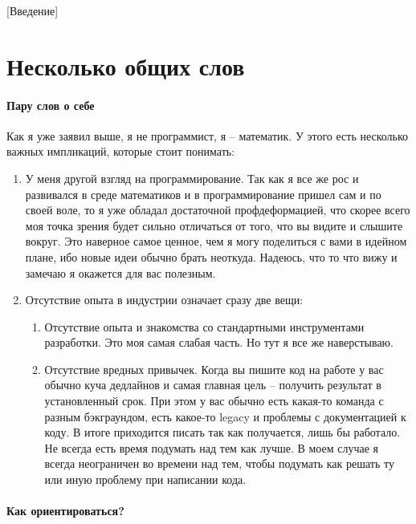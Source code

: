 [Введение]


\section{Несколько общих слов}

\paragraph{Пару слов о себе}

Как я уже заявил выше, я не программист, я -- математик.
У этого есть несколько важных импликаций, которые стоит понимать:
\begin{enumerate}
\item У меня другой взгляд на программирование.
Так как я все же рос и развивался в среде математиков и в программирование пришел сам и по своей воле, то я уже обладал достаточной профдеформацией, что скорее всего моя точка зрения будет сильно отличаться от того, что вы видите и слышите вокруг.
Это наверное самое ценное, чем я могу поделиться с вами в идейном плане, ибо новые идеи обычно брать неоткуда.
Надеюсь, что то что вижу и замечаю я окажется для вас полезным.

\item Отсутствие опыта в индустрии означает сразу две вещи:
\begin{enumerate}
\item Отсутствие опыта и знакомства со стандартными инструментами разработки.
Это моя самая слабая часть.
Но тут я все же наверстываю.

\item Отсутствие вредных привычек.
Когда вы пишите код на работе у вас обычно куча дедлайнов и самая главная цель -- получить результат в установленный срок.
При этом у вас обычно есть какая-то команда с разным бэкграундом, есть какое-то legacy и проблемы с документацией к коду.
В итоге приходится писать так как получается, лишь бы работало.
Не всегда есть время подумать над тем как лучше.
В моем случае я всегда неограничен во времени над тем, чтобы подумать как решать ту или иную проблему при написании кода.
\end{enumerate}
\end{enumerate}

\paragraph{Как ориентироваться?}

